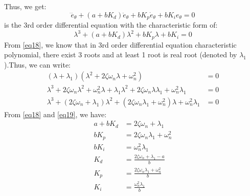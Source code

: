 \documentclass[12pt,a4paper]{article}
\begin{document}
	Thus, we get:
	\begin{equation}
		\label{eq17}
		\dddot{e}_{\theta} +(a+bK_d) \ddot{e}_{\theta} + bK_p\dot{e}_{\theta} + bK_ie_{\theta} = 0
	\end{equation}
	is the 3rd order differential equation with the characteristic form of:
	\begin{equation}
		\label{eq18}
		\lambda^3 + (a+bK_d)\lambda^2 + bK_p\lambda + bK_i = 0
	\end{equation}
	From \autoref{eq18}, we know that in 3rd order differential equation characteristic polynomial, there exist 3 roots and at least 1 root is real root (denoted by $\lambda_1$).Thus, we can write:
	\begin{equation}
		\label{eq19}
		\begin{split}
			(\lambda + \lambda_1)(\lambda^2 + 2\zeta\omega_n\lambda + \omega_n^2) &= 0 \\
			\lambda^3 + 2\zeta\omega_n\lambda^2 + \omega_n^2\lambda + \lambda_1\lambda^2 + 2\zeta\omega_n\lambda\lambda_1 + \omega_n^2\lambda_1 &= 0 \\
			\lambda^3 + (2\zeta\omega_n + \lambda_1)\lambda^2 + (2\zeta\omega_n\lambda_1 + \omega_n^2)\lambda + \omega_n^2\lambda_1 &= 0
		\end{split}
	\end{equation}
	From \autoref{eq18} and \autoref{eq19}, we have:
	\[\begin{split}
		a+bK_d &= 2\zeta\omega_n + \lambda_1 \\
		bK_p &= 2\zeta\omega_n\lambda_1 + \omega_n^2 \\
		bK_i &= \omega_n^2\lambda_1 \\
		K_d &= \frac{2\zeta\omega_n + \lambda_1 - a}{b} \\
		K_p &= \frac{2\zeta\omega_n\lambda_1 + \omega_n^2}{b} \\
		K_i &= \frac{\omega_n^2\lambda_1}{b}
	\end{split}\]
\end{document}
